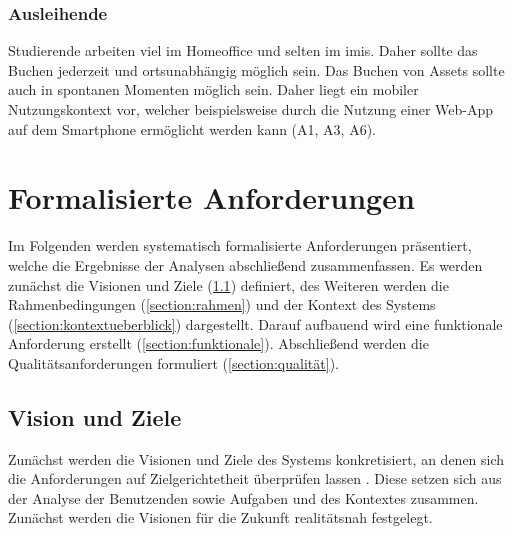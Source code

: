 \subsubsection{Ausleihende}
Studierende arbeiten viel im Homeoffice und selten im \ac{imis}. Daher sollte das Buchen jederzeit
und ortsunabhängig möglich sein. Das Buchen von Assets sollte auch in spontanen Momenten möglich
sein. Daher liegt ein mobiler Nutzungskontext vor, welcher beispielsweise durch die Nutzung einer
Web-App auf dem Smartphone ermöglicht werden kann (A1, A3, A6).


\section{Formalisierte Anforderungen}
\label{section:anforderung}

Im Folgenden werden systematisch formalisierte Anforderungen präsentiert, welche die Ergebnisse der
Analysen abschließend zusammenfassen. Es werden zunächst die Visionen und Ziele
(\ref{section:visionziel}) definiert, des Weiteren werden die Rahmenbedingungen
(\ref{section:rahmen}) und der Kontext des Systems (\ref{section:kontextueberblick}) dargestellt.
Darauf aufbauend wird eine funktionale Anforderung erstellt (\ref{section:funktionale}).
Abschließend werden die Qualitätsanforderungen formuliert (\ref{section:qualität}).


\subsection{Vision und Ziele}
\label{section:visionziel}
Zunächst werden die Visionen und Ziele des Systems konkretisiert, an denen sich die Anforderungen
auf Zielgerichtetheit überprüfen lassen \cite{balzert2009}. Diese setzen sich aus der Analyse der
Benutzenden sowie Aufgaben und des Kontextes zusammen. Zunächst werden die Visionen für die Zukunft
realitätsnah festgelegt.

